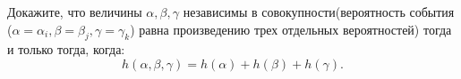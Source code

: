 Докажите, что величины $\alpha, \beta, \gamma$ независимы в совокупности(вероятность события
($\alpha = \alpha_i, \beta = \beta_j, \gamma = \gamma_k$) равна произведению трех отдельных вероятностей)
тогда и только тогда, когда:
$$
    h(\alpha, \beta, \gamma) = h(\alpha) + h(\beta) + h(\gamma).
$$